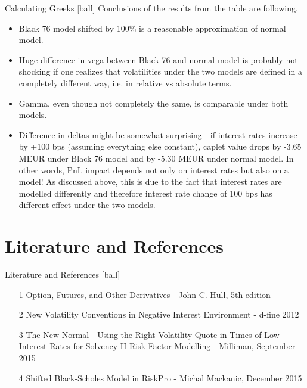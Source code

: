 \documentclass{beamer}
\begin{document}
\begin{frame}{Calculating Greeks}
[ball]
Conclusions of the results from the table are following.
\begin{itemize}
\item Black 76 model shifted by 100\% is a reasonable approximation of normal model.
\item Huge difference in vega between Black 76 and normal model is probably not shocking if one realizes that volatilities under the two models are defined in a completely different way, i.e. in relative vs absolute terms.
\item Gamma, even though not completely the same, is comparable under both models.
\item Difference in deltas might be somewhat surprising - if interest rates increase by +100 bps (assuming everything else constant), caplet value drops by -3.65 MEUR under Black 76 model and by -5.30 MEUR under normal model. In other words, PnL impact depends not only on interest rates but also on a model! As discussed above, this is due to the fact that interest rates are modelled differently and therefore interest rate change of 100 bps has different effect under the two models.
\end{itemize}
\end{frame}

\section{Literature and References}

\begin{frame}{Literature and References}
[ball]
\begin{itemize}
\item [1] Option, Futures, and Other Derivatives - John C. Hull, 5th edition
\item [2] New Volatility Conventions in Negative Interest Environment - d-fine 2012
\item [3] The New Normal - Using the Right Volatility Quote in Times of Low Interest Rates for Solvency II Risk Factor Modelling - Milliman, September 2015
\item [4] Shifted Black-Scholes Model in RiskPro - Michal Mackanic, December 2015
\end{itemize}
\end{frame}
\end{document}
